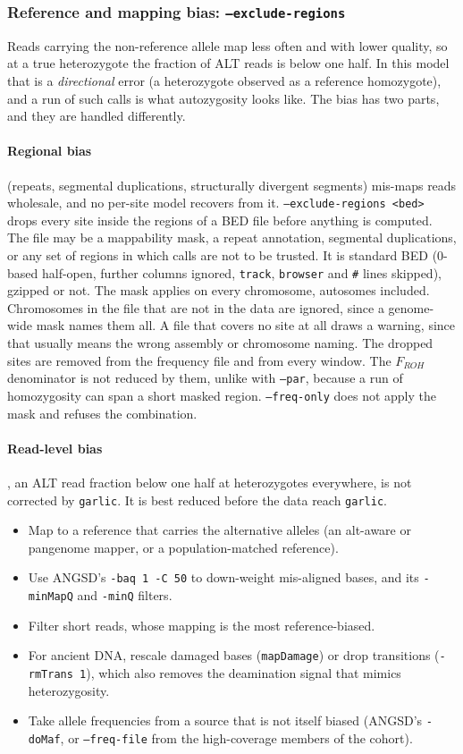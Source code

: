 \documentclass[12pt]{article}%
\begin{document}
\subsubsection{Reference and mapping bias: {\tt --exclude-regions}}
\label{sec:refbias}

Reads carrying the non-reference allele map less often and with lower quality, so at a true heterozygote the fraction of ALT reads is below one half.  In this model that is a {\em directional} error (a heterozygote observed as a reference homozygote), and a run of such calls is what autozygosity looks like.  The bias has two parts, and they are handled differently.

\paragraph{Regional bias} (repeats, segmental duplications, structurally divergent segments) mis-maps reads wholesale, and no per-site model recovers from it.  {\tt --exclude-regions <bed>} drops every site inside the regions of a BED file before anything is computed.  The file may be a mappability mask, a repeat annotation, segmental duplications, or any set of regions in which calls are not to be trusted.  It is standard BED (0-based half-open, further columns ignored, {\tt track}, {\tt browser} and {\tt \#} lines skipped), gzipped or not.  The mask applies on every chromosome, autosomes included.  Chromosomes in the file that are not in the data are ignored, since a genome-wide mask names them all.  A file that covers no site at all draws a warning, since that usually means the wrong assembly or chromosome naming.  The dropped sites are removed from the frequency file and from every window.  The $F_{ROH}$ denominator is not reduced by them, unlike with {\tt --par}, because a run of homozygosity can span a short masked region.  {\tt --freq-only} does not apply the mask and refuses the combination.

\paragraph{Read-level bias}, an ALT read fraction below one half at heterozygotes everywhere, is not corrected by {\tt garlic}.  It is best reduced before the data reach {\tt garlic}.
\begin{itemize}
\item Map to a reference that carries the alternative alleles (an alt-aware or pangenome mapper, or a population-matched reference).
\item Use ANGSD's {\tt -baq 1 -C 50} to down-weight mis-aligned bases, and its {\tt -minMapQ} and {\tt -minQ} filters.
\item Filter short reads, whose mapping is the most reference-biased.
\item For ancient DNA, rescale damaged bases ({\tt mapDamage}) or drop transitions ({\tt -rmTrans 1}), which also removes the deamination signal that mimics heterozygosity.
\item Take allele frequencies from a source that is not itself biased (ANGSD's {\tt -doMaf}, or {\tt --freq-file} from the high-coverage members of the cohort).
\end{itemize}
\end{document}
